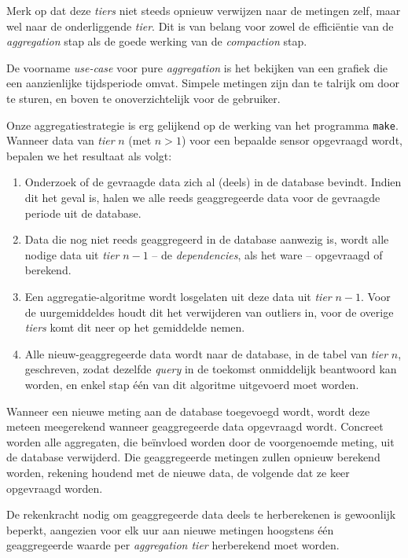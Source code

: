 \documentclass[12pt,parskip=full]{article}
\begin{document}
Merk op dat deze \emph{tiers} niet steeds opnieuw verwijzen naar de metingen zelf, maar wel naar de onderliggende \emph{tier}. Dit is van belang voor zowel de effici\"entie van de \emph{aggregation} stap als de goede werking van de \emph{compaction} stap.

De voorname \emph{use-case} voor pure \emph{aggregation} is het bekijken van een grafiek die een aanzienlijke tijdsperiode omvat. Simpele metingen zijn dan te talrijk om door te sturen, en boven te onoverzichtelijk voor de gebruiker.

Onze aggregatiestrategie is erg gelijkend op de werking van het programma \texttt{make}. Wanneer data van \emph{tier} $n$ (met $n > 1$) voor een bepaalde sensor opgevraagd wordt, bepalen we het resultaat als volgt:

\begin{enumerate}
	\item Onderzoek of de gevraagde data zich al (deels) in de database bevindt. Indien dit het geval is, halen we alle reeds geaggregeerde data voor de gevraagde periode uit de database.

	\item Data die nog niet reeds geaggregeerd in de database aanwezig is, wordt alle nodige data uit \emph{tier} $n - 1$ -- de \emph{dependencies}, als het ware -- opgevraagd of berekend.

	\item Een aggregatie-algoritme wordt losgelaten uit deze data uit \emph{tier} $n - 1$. Voor de uurgemiddeldes houdt dit het verwijderen van outliers in, voor de overige \emph{tiers} komt dit neer op het gemiddelde nemen.

	\item Alle nieuw-geaggregeerde data wordt naar de database, in de tabel van \emph{tier} $n$, geschreven, zodat dezelfde \emph{query} in de toekomst onmiddelijk beantwoord kan worden, en enkel stap \'e\'en van dit algoritme uitgevoerd moet worden.
\end{enumerate}

Wanneer een nieuwe meting aan de database toegevoegd wordt, wordt deze meteen meegerekend wanneer geaggregeerde data opgevraagd wordt. Concreet worden alle aggregaten, die be\"invloed worden door de voorgenoemde meting, uit de database verwijderd. Die geaggregeerde metingen zullen opnieuw berekend worden, rekening houdend met de nieuwe data, de volgende dat ze keer opgevraagd worden.

De rekenkracht nodig om geaggregeerde data deels te herberekenen is gewoonlijk beperkt, aangezien voor elk uur aan nieuwe metingen hoogstens \'e\'en geaggregeerde waarde per \emph{aggregation tier} herberekend moet worden.
\end{document}
